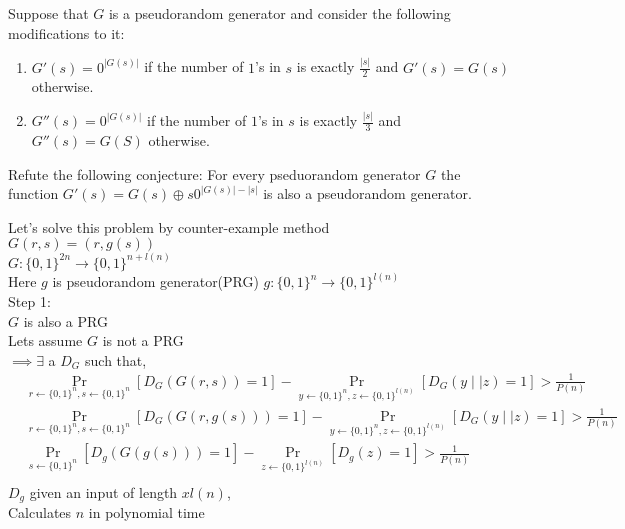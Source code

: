 \documentclass[11pt]{exam}
\newcommand\tab[1][1cm]{\hspace*{#1}}
\begin{document}
\begin{questions}
\question[10]  
Suppose that $G$ is a pseudorandom generator and consider the following modifications to it:
\begin{enumerate}
    \item $G'(s)=0^{|G(s)|}$ if the number of $1$'s in $s$ is exactly $\frac{|s|}{2}$ and $G'(s)=G(s)$ otherwise.
    \item $G''(s)=0^{|G(s)|}$ if the number of $1$'s in $s$ is exactly $\frac{|s|}{3}$ and $G''(s)=G(S)$ otherwise. 
\end{enumerate}

\question[10]  
Refute the following conjecture: For every pseduorandom generator $G$ the function $G'(s)=G(s) \oplus s0^{|G(s)|-|s|}$ is also a pseudorandom generator. 
\begin{solution}
    Let's solve this problem by counter-example method\\
    $G(r,s) = (r,g(s))$\\
    $G\colon \{0,1\}^{2n} \rightarrow \{0,1\}^{n+l(n)}$\\
    Here $g$ is pseudorandom generator(PRG) $g\colon \{0,1\}^n \rightarrow \{0,1\}^{l(n)}$\\
    Step 1:\\
    $G$ is also a PRG\\
    Lets assume $G$ is not a PRG\\
    $\implies \exists $ \tab[0.5cm] a $D_G$ such that,\\
    \begin{align*}
        &\Pr\limits_{r\leftarrow \{0,1\}^n, s\leftarrow\{0,1\}^n}[D_G(G(r,s))=1] - \Pr\limits_{y\leftarrow\{0,1\}^n,z\leftarrow\{0,1\}^{l(n)}}[D_G(y \mid\mid z) = 1] > \frac{1}{P(n)}\\
        &\Pr\limits_{r\leftarrow \{0,1\}^n, s\leftarrow\{0,1\}^n}[D_G(G(r,g(s)))=1] - \Pr\limits_{y\leftarrow\{0,1\}^n,z\leftarrow\{0,1\}^{l(n)}}[D_G(y \mid\mid z) = 1] > \frac{1}{P(n)}\\
        &\Pr\limits_{s\leftarrow\{0,1\}^n}[D_g(G(g(s)))=1] - \Pr\limits_{z\leftarrow\{0,1\}^{l(n)}}[D_g(z) = 1] > \frac{1}{P(n)}\\
    \end{align*}
    $D_g$ given an input of length $xl(n)$,\\
    Calculates $n$ in polynomial time\\

\end{solution}
\end{questions}
\end{document}
